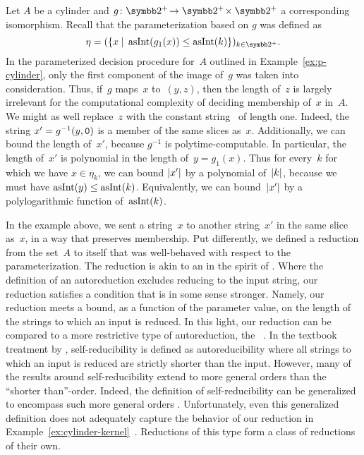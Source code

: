 \begin{example}
\label{ex:cylinder-kernel}%
  Let $A$ be a \pdash{}cylinder and $g\colon \binary^+\! \to \binary^+\! \times \binary^+$ a corresponding isomorphism.
  Recall that the parameterization based on $g$ was defined as
  \begin{equation*}
    \eta \deq (\{x \st \asNat(g_1(x)) \le \asNat(k)\})_{k \in \binary^+}.
  \end{equation*}
  In the parameterized decision procedure for~$A$ outlined in Example~\ref{ex:p-cylinder}, only the first component of the image of~$g$ was taken into consideration.
  Thus, if~$g$ maps~$x$ to~$(y, z)$, then the length of~$z$ is largely irrelevant for the computational complexity of deciding membership of~$x$ in~$A$.
  We might as well replace~$z$ with the constant string~ of length one.
  Indeed, the string $x' = g^{-1}(y, \textnormal{\texttt{0}})$ is a member of the same slices as~$x$.
  Additionally, we can bound the length of~$x'$, because $g^{-1}$ is polytime-computable.
  In particular, the length of~$x'$ is polynomial in the length of~$y = g_1(x)$.
  Thus for every~$k$ for which we have $x \in \eta_k$, we can bound ${\lvert x'\rvert}$ by a polynomial of~${\lvert k\rvert}$, because we must have $\operatorname{asInt}(y) \le \operatorname{asInt}(k)$.
  Equivalently, we can bound~${\lvert x'\rvert}$ by a polylogarithmic function of~$\operatorname{asInt}(k)$.
\end{example}

In the example above, we sent a string~$x$ to another string~$x'$ in the same slice as~$x$, in a way that preserves membership.
Put differently, we defined a reduction from the set~$A$ to itself that was well-behaved with respect to the parameterization.
The reduction is akin to an  in the spirit of \textcite{trakhtenbrot1970autoreducibility}.
Where the definition of an autoreduction excludes reducing to the input string, our reduction satisfies a condition that is in some sense stronger.
Namely, our reduction meets a bound, as a function of the parameter value, on the length of the strings to which an input is reduced.
In this light, our reduction can be compared to a more restrictive type of autoreduction, the ~\parencite{meyer1979with}.
In the textbook treatment by \textcite[Section~4.5]{balcazar1995structural}, self-reducibility is defined as autoreducibility where all strings to which an input is reduced are strictly shorter than the input.
However, many of the results around self-reducibility extend to more general orders than the \enquote{shorter than}-order.
Indeed, the definition of self-reducibility can be generalized to encompass such more general orders \parencite{ko1983self,orponen1986optimal,buhrman1996p-selective}.
Unfortunately, even this generalized definition does not adequately capture the behavior of our reduction in Example~\ref{ex:cylinder-kernel}~\parencite{chen2011lower}.
Reductions of this type form a class of reductions of their own.

